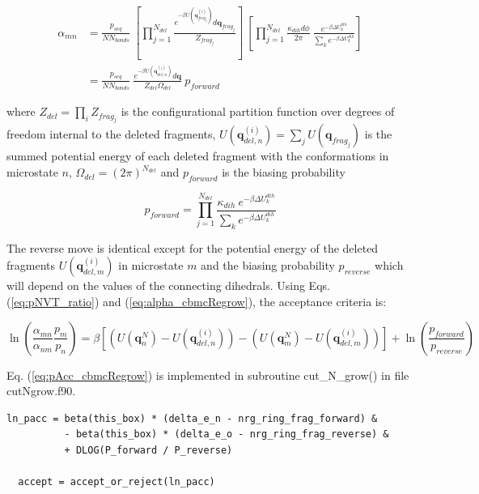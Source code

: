 \begin{align}
\alpha_{mn} &= \frac{p_{seq}}{N N_{bonds}}\ \left[\prod_{j=1}^{N_{del}}{\frac{e^{-\beta U(\mathbf{q}^{(i)}_{frag_j})}d\mathbf{q}_{frag_j}}{Z_{frag_j}}}\right]\ \left[\prod_{j=1}^{N_{del}}{\frac{\kappa_{dih}d\phi}{2\pi}\ \frac{e^{-\beta \Delta U_k^{dih}}}{\sum_k{e^{-\beta \Delta U_k^{dih}}}}}\right] \nonumber \\
\label{eq:alpha_cbmcRegrow}
&= \frac{p_{seq}}{N N_{bonds}}\ \frac{e^{-\beta U(\mathbf{q}^{(i)}_{del,n})}d\mathbf{q}}{Z_{del}\Omega_{del}}\ p_{forward}
\end{align}

where $Z_{del} = \prod_i Z_{frag_j}$ is the configurational partition function over degrees of freedom internal to the deleted fragments, $U(\mathbf{q}^{(i)}_{del,n}) = \sum_jU(\mathbf{q}_{frag_j})$ is the summed potential energy of each deleted fragment with the conformations in microstate $n$, $\Omega_{del} = (2\pi)^{N_{del}}$ and $p_{forward}$ is the biasing probability

\begin{equation}
p_{forward} = \prod_{j=1}^{N_{del}}{\frac{\kappa_{dih}\ e^{-\beta \Delta U_k^{dih}}}{\sum_k{e^{-\beta \Delta U_k^{dih}}}}}
\end{equation}

The reverse move is identical except for the potential energy of the deleted fragments $U(\mathbf{q}^{(i)}_{del,m})$ in microstate $m$ and the biasing probability $p_{reverse}$ which will depend on the values of the connecting dihedrals. Using Eqs. (\ref{eq:pNVT_ratio}) and (\ref{eq:alpha_cbmcRegrow}), the acceptance criteria is:

\begin{equation}
\label{eq:pAcc_cbmcRegrow}
\ln\left( \frac{\alpha_{mn}}{\alpha_{nm}} \frac{p_m}{p_n} \right) = \beta \left[\left( U(\mathbf{q}^N_n) - U(\mathbf{q}^{(i)}_{del,n})\right) - \left(U(\mathbf{q}^N_m) - U(\mathbf{q}^{(i)}_{del,m})\right)\right] + \ln\left( \frac{p_{forward}}{p_{reverse}} \right)
\end{equation}

Eq. (\ref{eq:pAcc_cbmcRegrow}) is implemented in subroutine cut\_N\_grow() in file cutNgrow.f90. 

\begin{minipage}{\linewidth}
\begin{lstlisting}[firstnumber=392, caption=cutNgrow.f90, label=code:cbmcRegrow]
  ln_pacc = beta(this_box) * (delta_e_n - nrg_ring_frag_forward) &
          - beta(this_box) * (delta_e_o - nrg_ring_frag_reverse) &
          + DLOG(P_forward / P_reverse)

  accept = accept_or_reject(ln_pacc)
\end{lstlisting}
\end{minipage}

